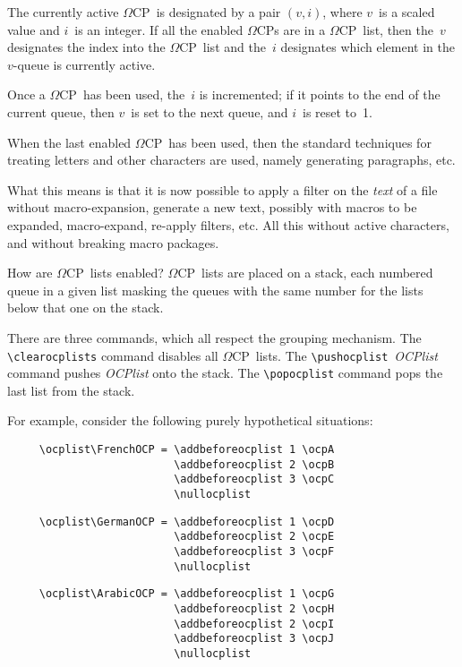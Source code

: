 \documentclass[fleqn]{article}
\newcommand{\OMEGA}{$\Omega$}
\newcommand{\OCP}{\OMEGA CP}
\begin{document}
The currently active \OCP\ is designated by a pair $(v,i)$, 
where $v$~is a scaled value and $i$~is an integer.  If all the
enabled \OCP s are in a \OCP\ list, then the~$v$ designates the index into
the \OCP\ list and the~$i$ designates which element in the $v$-queue is
currently active.

Once a \OCP\ has been used, the~$i$ is incremented; if it points to the
end of the current queue, then $v$~is set to the next queue, and
$i$~is reset to~1.

When the last enabled \OCP\ has been used, then the standard techniques
for treating letters and other characters are used, namely generating
paragraphs, etc.

What this means is that it is now possible to apply a filter on the 
\emph{text} of a file without macro-expansion, generate a new text,
possibly with macros to be expanded, macro-expand, re-apply filters,
etc.  All this without active characters, and without breaking macro
packages.

How are \OCP\ lists enabled?  \OCP\ lists are placed on a stack, each
numbered queue in a given list masking the queues with the same number
for the lists below that one on the stack.

There are three commands, which all respect the grouping mechanism.
The \verb|\clearocplists| command disables all \OCP\ lists.
The \verb|\pushocplist|~\emph{OCPlist} command pushes \emph{OCPlist}
onto the stack. The \verb|\popocplist| command pops the last list 
from the stack.

For example, consider the following purely hypothetical situations:
\begin{verbatim}
     \ocplist\FrenchOCP = \addbeforeocplist 1 \ocpA
                          \addbeforeocplist 2 \ocpB
                          \addbeforeocplist 3 \ocpC
                          \nullocplist
\end{verbatim}

\begin{verbatim}
     \ocplist\GermanOCP = \addbeforeocplist 1 \ocpD
                          \addbeforeocplist 2 \ocpE
                          \addbeforeocplist 3 \ocpF
                          \nullocplist
\end{verbatim}

\begin{verbatim}
     \ocplist\ArabicOCP = \addbeforeocplist 1 \ocpG
                          \addbeforeocplist 2 \ocpH
                          \addbeforeocplist 2 \ocpI
                          \addbeforeocplist 3 \ocpJ
                          \nullocplist
\end{verbatim}
\end{document}
